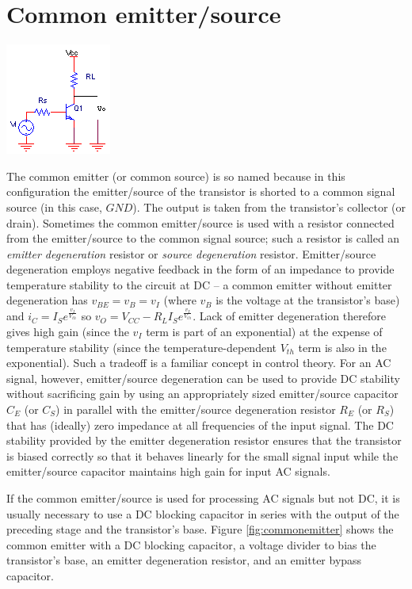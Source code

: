 \section{Common emitter/source}
\begin{center}
	\includegraphics{schematics/basiccommonemitter.PNG}
\end{center}
\par
The common emitter (or common source) is so named because in this configuration the emitter/source of the transistor is shorted to a common signal source (in this case, $GND$). The output is taken from the transistor's collector (or drain). Sometimes the common emitter/source is used with a resistor connected from the emitter/source to the common signal source; such a resistor is called an \textit{emitter degeneration} resistor or \textit{source degeneration} resistor. Emitter/source degeneration employs negative feedback in the form of an impedance to provide temperature stability to the circuit at DC -- a common emitter without emitter degeneration has $v_{BE} = v_{B} = v_{I}$ (where $v_{B}$ is the voltage at the transistor's base) and $i_{C} = I_{S}e^{\frac{v_{I}}{V_{th}}}$ so $v_{O} = V_{CC} - R_{L}I_{S}e^{\frac{v_{I}}{V_{th}}}$. Lack of emitter degeneration therefore gives high gain (since the $v_{I}$ term is part of an exponential) at the expense of temperature stability (since the temperature-dependent $V_{th}$ term is also in the exponential). Such a tradeoff is a familiar concept in control theory. For an AC signal, however, emitter/source degeneration can be used to provide DC stability without sacrificing gain by using an appropriately sized emitter/source capacitor $C_{E}$ (or $C_{S}$) in parallel with the emitter/source degeneration resistor $R_{E}$ (or $R_{S}$) that has (ideally) zero impedance at all frequencies of the input signal. The DC stability provided by the emitter degeneration resistor ensures that the transistor is biased correctly so that it behaves linearly for the small signal input while the emitter/source capacitor maintains high gain for input AC signals.
\par
If the common emitter/source is used for processing AC signals but not DC, it is usually necessary to use a DC blocking capacitor in series with the output of the preceding stage and the transistor's base. Figure \ref{fig:commonemitter} shows the common emitter with a DC blocking capacitor, a voltage divider to bias the transistor's base, an emitter degeneration resistor, and an emitter bypass capacitor.

